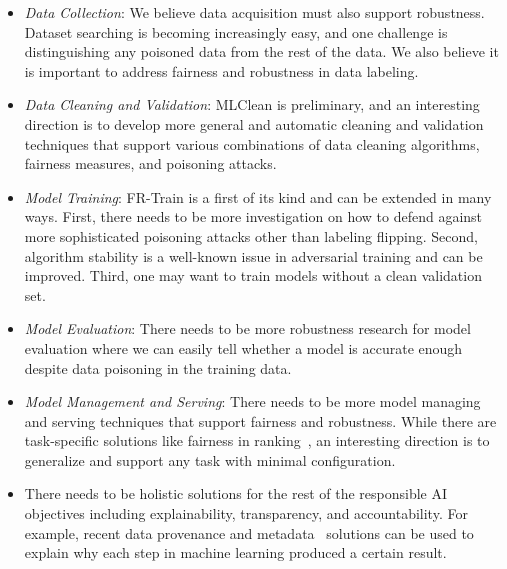 \documentclass[11pt]{article}
\newcommand{\frtrain}{FR-Train}
\newcommand{\mc}{MLClean}
\begin{document}
\begin{itemize}
\item {\em Data Collection}: We believe data acquisition must also support robustness. Dataset searching is becoming increasingly easy, and one challenge is distinguishing any poisoned data from the rest of the data. We also believe it is important to address fairness and robustness in data labeling. 

\item {\em Data Cleaning and Validation}: \mc{} is preliminary, and an interesting direction is to develop more general and automatic cleaning and validation techniques that support various combinations of data cleaning algorithms, fairness measures, and poisoning attacks.

\item {\em Model Training}: \frtrain{} is a first of its kind and can be extended in many ways. First, there needs to be more investigation on how to defend against more sophisticated poisoning attacks other than labeling flipping. Second, algorithm stability is a well-known issue in adversarial training and can be improved. Third, one may want to train models without a clean validation set.

\item {\em Model Evaluation}: There needs to be more robustness research for model evaluation where we can easily tell whether a model is accurate enough despite data poisoning in the training data.

\item {\em Model Management and Serving}: There needs to be more model managing and serving techniques that support fairness and robustness. While there are task-specific solutions like fairness in ranking~\cite{DBLP:journals/pvldb/AsudehJ20a}, an interesting direction is to generalize and support any task with minimal configuration.

\item There needs to be holistic solutions for the rest of the responsible AI objectives including explainability, transparency, and accountability. For example, recent data provenance and metadata~\cite{mlmd, bender-friedman-2018-data} solutions can be used to explain why each step in machine learning produced a certain result.

\end{itemize}

\end{document}
